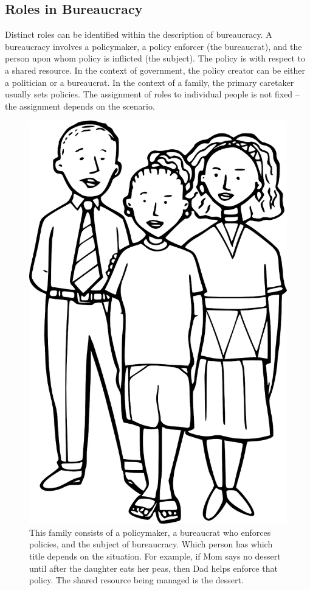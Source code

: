 \subsection*{Roles in Bureaucracy}

Distinct roles can be identified within the description of bureaucracy.
A bureaucracy involves a \gls{policymaker}, 
a policy enforcer (the bureaucrat), and the person upon whom policy is inflicted (the subject). The policy is with respect to a shared resource. In the context of government, the policy creator can be either a politician or a bureaucrat. In the context of a family, the primary caretaker usually sets policies. The assignment of roles to individual people is not fixed -- the assignment depends on the scenario. 

\begin{figure}
    \centering
    \includegraphics[width=.6\textwidth]{images/family-father-mother-daughter-28725_1280_pixabay.png}
    \caption{This family consists of a policymaker, a bureaucrat who enforces policies, and the subject of bureaucracy. Which person has which title depends on the situation. For example, if Mom says no dessert until after the daughter eats her peas, then Dad helps enforce that policy. The shared resource being managed is the dessert. }
    \label{fig:family-of-bureaucrats}
\end{figure}

